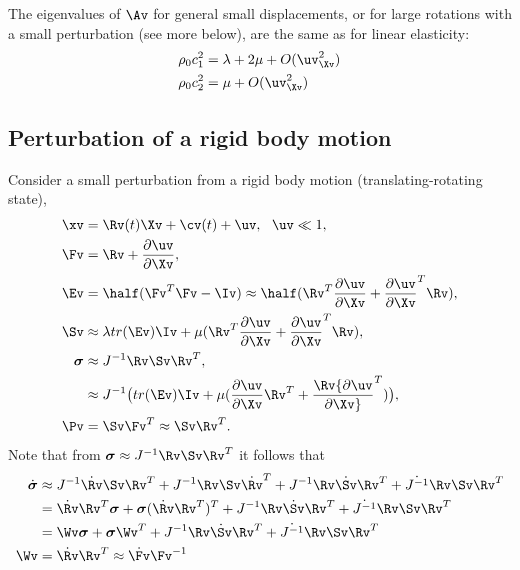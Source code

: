 The eigenvalues of $\Av$ for general small displacements, 
or for large rotations with a small perturbation (see more below), are
the same as for linear elasticity: 
\begin{align}
  \rho_0 c_1^2  &= \lambda+2\mu  +O( \uv_\Xv^2 ) \\
  \rho_0 c_2^2  &= \mu +O( \uv_\Xv^2 )
\end{align}


\subsection{Perturbation of a rigid body motion}

 Consider a small perturbation from a rigid body motion (translating-rotating state),
\begin{align}
 \xv &= \Rv(t) \Xv + \cv(t) + \uv , ~~ \uv \ll 1 , \\
 \Fv & = \Rv + {\partial \uv\over\partial \Xv}, \\
 \Ev &= \half( \Fv^T \Fv -\Iv) 
         \approx \half( \Rv^T {\partial \uv\over\partial \Xv} + {\partial \uv\over\partial \Xv}^T \Rv), \\
 \Sv & \approx \lambda tr(\Ev)\Iv + \mu( \Rv^T {\partial \uv\over\partial \Xv} + {\partial \uv\over\partial \Xv}^T \Rv ), \\
 \sigmav & \approx J^{-1} \Rv \Sv \Rv^T,  \\
         & \approx  J^{-1}\big( tr(\Ev)\Iv + 
               \mu( {\partial \uv\over\partial \Xv}\Rv^T + \Rv {\partial \uv\over\partial \Xv}^T )\big), \\
 \Pv &= \Sv \Fv^T \approx \Sv \Rv^T .
\end{align}
Note that from $\sigmav \approx J^{-1} \Rv \Sv \Rv^T$ it follows that 
\begin{align}
\dot{\sigmav} & \approx J^{-1} \dot{\Rv} \Sv \Rv^T + J^{-1} \Rv \Sv \dot{\Rv}^T  + J^{-1} \Rv \dot{\Sv} \Rv^T 
              + \dot{J^{-1}} \Rv \Sv \Rv^T \\
      &= \dot{\Rv}\Rv^T \sigmav + \sigmav ( \dot{\Rv}\Rv^T)^T + J^{-1} \Rv \dot{\Sv} \Rv^T + \dot{J^{-1}} \Rv \Sv \Rv^T\\
      &=  \Wv \sigmav + \sigmav \Wv^T + J^{-1} \Rv \dot{\Sv} \Rv^T + \dot{J^{-1}} \Rv \Sv \Rv^T \\
 \Wv &= \dot{\Rv}\Rv^T \approx \dot{\Fv}\Fv^{-1} 
 \end{align}

